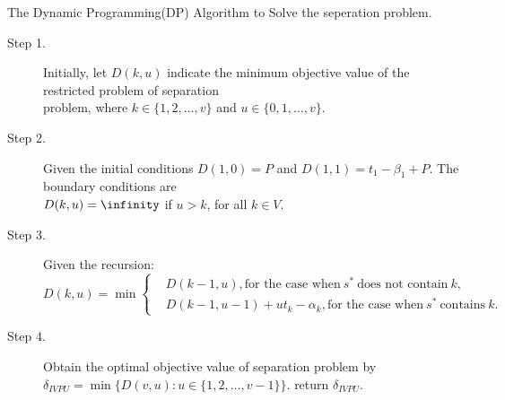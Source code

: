 \begin{algorithm}[h]\label{algoDP}
\caption{The Dynamic Programming(DP) Algorithm to Solve the seperation problem.}
\begin{algorithmic}[1]


\begin{description}
  \item[Step 1.] Initially, let $D(k,u)$ indicate the minimum objective value of the restricted problem of separation \\
  \vspace{10pt}
  problem, where $k\in \{1,2,\ldots,v\}$ and $u\in \{0,1,\ldots,v\}$.
  \item[Step 2.] Given the initial conditions $D(1,0) = P$ and $D(1,1) = t_1 - \beta_1 +P$. The boundary conditions are \\
  \vspace{10pt}
  $D(k,u) = \infinity$ if $u > k$, for all $k \in V$.
  \item[Step 3.] Given the recursion:
  \begin{equation*}
  D(k,u)= \min \left\{
  \begin{aligned}
  & D(k-1,u), \text{for the case when} \ s^* \ \text{does not contain} \ k, \\
  & D(k-1,u-1) + u t_k - \alpha_k ,\text{for the case when} \ s^* \ \text{contains} \ k.
  \end{aligned}
  \right.
  \end{equation*}

  \item[Step 4.] Obtain the optimal objective value of separation problem by
  $\delta_{IVPU} = \min\{D(v,u): u\in \{1,2,\ldots,v-1\}\}$.
   return $\delta_{IVPU}$.
\end{description}

\end{algorithmic}
\end{algorithm}

